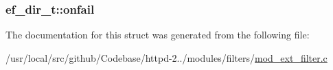 \subsubsection[{\texorpdfstring{onfail}{onfail}}]{ ef\+\_\+dir\+\_\+t\+::onfail}\hypertarget{structef__dir__t_a3cc0345bf3c5a17621eb77c91d77029b}{}\label{structef__dir__t_a3cc0345bf3c5a17621eb77c91d77029b}


The documentation for this struct was generated from the following file\+:\begin{DoxyCompactItemize}
\item 
/usr/local/src/github/\+Codebase/httpd-\/2../modules/filters/\hyperlink{mod__ext__filter_8c}{mod\+\_\+ext\+\_\+filter.\+c}\end{DoxyCompactItemize}

